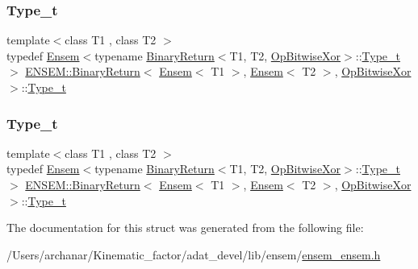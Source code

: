 \subsubsection{\texorpdfstring{Type\_t}{Type\_t}\hspace{0.1cm}{\footnotesize\ttfamily [1/2]}}
{\footnotesize\ttfamily template$<$class T1 , class T2 $>$ \\
typedef \mbox{\hyperlink{classENSEM_1_1Ensem}{Ensem}}$<$typename \mbox{\hyperlink{structENSEM_1_1BinaryReturn}{Binary\+Return}}$<$T1, T2, \mbox{\hyperlink{structENSEM_1_1OpBitwiseXor}{Op\+Bitwise\+Xor}}$>$\+::\mbox{\hyperlink{structENSEM_1_1BinaryReturn_3_01Ensem_3_01T1_01_4_00_01Ensem_3_01T2_01_4_00_01OpBitwiseXor_01_4_abc459c7c3854c531a9ab9e4eaac9a78a}{Type\+\_\+t}}$>$ \mbox{\hyperlink{structENSEM_1_1BinaryReturn}{E\+N\+S\+E\+M\+::\+Binary\+Return}}$<$ \mbox{\hyperlink{classENSEM_1_1Ensem}{Ensem}}$<$ T1 $>$, \mbox{\hyperlink{classENSEM_1_1Ensem}{Ensem}}$<$ T2 $>$, \mbox{\hyperlink{structENSEM_1_1OpBitwiseXor}{Op\+Bitwise\+Xor}} $>$\+::\mbox{\hyperlink{structENSEM_1_1BinaryReturn_3_01Ensem_3_01T1_01_4_00_01Ensem_3_01T2_01_4_00_01OpBitwiseXor_01_4_abc459c7c3854c531a9ab9e4eaac9a78a}{Type\+\_\+t}}}

\mbox{\label{structENSEM_1_1BinaryReturn_3_01Ensem_3_01T1_01_4_00_01Ensem_3_01T2_01_4_00_01OpBitwiseXor_01_4_abc459c7c3854c531a9ab9e4eaac9a78a}} 
\subsubsection{\texorpdfstring{Type\_t}{Type\_t}\hspace{0.1cm}{\footnotesize\ttfamily [2/2]}}
{\footnotesize\ttfamily template$<$class T1 , class T2 $>$ \\
typedef \mbox{\hyperlink{classENSEM_1_1Ensem}{Ensem}}$<$typename \mbox{\hyperlink{structENSEM_1_1BinaryReturn}{Binary\+Return}}$<$T1, T2, \mbox{\hyperlink{structENSEM_1_1OpBitwiseXor}{Op\+Bitwise\+Xor}}$>$\+::\mbox{\hyperlink{structENSEM_1_1BinaryReturn_3_01Ensem_3_01T1_01_4_00_01Ensem_3_01T2_01_4_00_01OpBitwiseXor_01_4_abc459c7c3854c531a9ab9e4eaac9a78a}{Type\+\_\+t}}$>$ \mbox{\hyperlink{structENSEM_1_1BinaryReturn}{E\+N\+S\+E\+M\+::\+Binary\+Return}}$<$ \mbox{\hyperlink{classENSEM_1_1Ensem}{Ensem}}$<$ T1 $>$, \mbox{\hyperlink{classENSEM_1_1Ensem}{Ensem}}$<$ T2 $>$, \mbox{\hyperlink{structENSEM_1_1OpBitwiseXor}{Op\+Bitwise\+Xor}} $>$\+::\mbox{\hyperlink{structENSEM_1_1BinaryReturn_3_01Ensem_3_01T1_01_4_00_01Ensem_3_01T2_01_4_00_01OpBitwiseXor_01_4_abc459c7c3854c531a9ab9e4eaac9a78a}{Type\+\_\+t}}}



The documentation for this struct was generated from the following file\+:\begin{DoxyCompactItemize}
\item 
/\+Users/archanar/\+Kinematic\+\_\+factor/adat\+\_\+devel/lib/ensem/\mbox{\hyperlink{lib_2ensem_2ensem__ensem_8h}{ensem\+\_\+ensem.\+h}}\end{DoxyCompactItemize}
